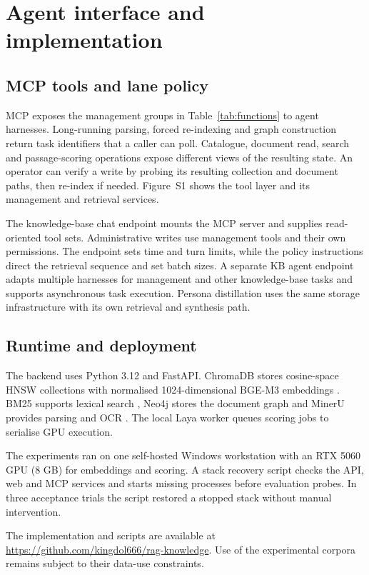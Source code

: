 \section{Agent interface and implementation}
\label{sec:implementation}
\label{sec:impl}

\subsection{MCP tools and lane policy}
\label{sec:impl-tools}

MCP exposes the management groups in Table~\ref{tab:functions} to agent
harnesses. Long-running parsing, forced re-indexing and graph construction
return task identifiers that a caller can poll. Catalogue, document read,
search and passage-scoring operations expose different views of the
resulting state. An operator can verify a write by probing its resulting
collection and document paths, then re-index if needed. Figure~S1 shows the tool layer and
its management and retrieval services.

The knowledge-base chat endpoint mounts the MCP server and supplies
read-oriented tool sets. Administrative writes use management tools and
their own permissions. The endpoint sets time and turn limits, while the
policy instructions direct the retrieval sequence and set batch sizes.
A separate KB agent endpoint adapts multiple harnesses for management and
other knowledge-base tasks and supports asynchronous task execution.
Persona distillation uses the same storage infrastructure with its own
retrieval and synthesis path.

\subsection{Runtime and deployment}
\label{sec:impl-runtime}

The backend uses Python 3.12 and FastAPI. ChromaDB stores cosine-space HNSW
collections with normalised 1024-dimensional BGE-M3 embeddings
\cite{chroma,hnsw,bge-m3}. BM25 supports lexical search \cite{bm25}, Neo4j
stores the document graph \cite{neo4j} and MinerU provides parsing and OCR
\cite{mineru}. The local Laya worker queues scoring jobs to serialise GPU
execution.

The experiments ran on one self-hosted Windows workstation with an RTX
5060 GPU (8 GB) for embeddings and scoring. A stack recovery script checks
the API, web and MCP services and starts missing processes before evaluation
probes. In three acceptance trials the script restored a stopped stack
without manual intervention.

The implementation and scripts are available at
\url{https://github.com/kingdol666/rag-knowledge}. Use of the experimental
corpora remains subject to their data-use constraints.
